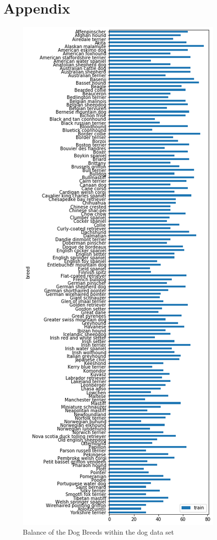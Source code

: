 \documentclass[paper=A4, DIV=10, parskip=half]{scrartcl}
\begin{document}
\section*{Appendix}
\begin{figure}[H]
  \centering
  \includegraphics[height=0.95\textheight]{images/dog_train_balance.png}
  \caption{Balance of the Dog Breeds within the dog data set}
  \label{dog_train_balance}
\end{figure}
\end{document}
